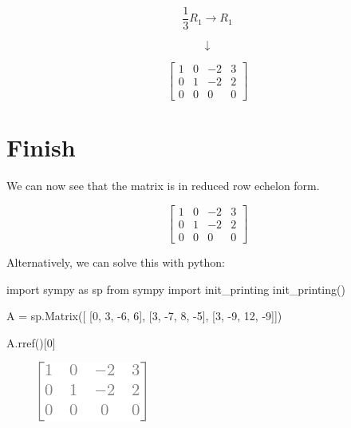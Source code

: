 \documentclass[
  letterpaper,
  DIV=11,
  numbers=noendperiod]{scrreprt}
\newenvironment{Shaded}{\begin{snugshade}}{\end{snugshade}}
\newcommand{\DecValTok}[1]{\textcolor[rgb]{0.68,0.00,0.00}{#1}}
\newcommand{\ImportTok}[1]{\textcolor[rgb]{0.00,0.46,0.62}{#1}}
\newcommand{\NormalTok}[1]{\textcolor[rgb]{0.00,0.23,0.31}{#1}}
\newcommand{\OperatorTok}[1]{\textcolor[rgb]{0.37,0.37,0.37}{#1}}
\begin{document}
\[
\frac{1}{3}R_1 \rightarrow R_1
\]

\[
\downarrow
\]

\[
\begin{bmatrix}
    1 & 0 & -2 & 3 \\
    0 & 1 & -2 & 2 \\
    0 & 0 & 0 & 0
\end{bmatrix}
\]

\chapter{Finish}

We can now see that the matrix is in reduced row echelon form.

\[
\begin{bmatrix}
    1 & 0 & -2 & 3 \\
    0 & 1 & -2 & 2 \\
    0 & 0 & 0 & 0
\end{bmatrix}
\]

Alternatively, we can solve this with python:

\begin{Shaded}
\begin{Highlighting}[]
\ImportTok{import}\NormalTok{ sympy }\ImportTok{as}\NormalTok{ sp  }
\ImportTok{from}\NormalTok{ sympy }\ImportTok{import}\NormalTok{ init\_printing}
\NormalTok{init\_printing()}

\NormalTok{A }\OperatorTok{=}\NormalTok{ sp.Matrix([}
\NormalTok{    [}\DecValTok{0}\NormalTok{,  }\DecValTok{3}\NormalTok{,  }\OperatorTok{{-}}\DecValTok{6}\NormalTok{,   }\DecValTok{6}\NormalTok{], }
\NormalTok{    [}\DecValTok{3}\NormalTok{, }\OperatorTok{{-}}\DecValTok{7}\NormalTok{,   }\DecValTok{8}\NormalTok{,  }\OperatorTok{{-}}\DecValTok{5}\NormalTok{], }
\NormalTok{    [}\DecValTok{3}\NormalTok{, }\OperatorTok{{-}}\DecValTok{9}\NormalTok{,  }\DecValTok{12}\NormalTok{,  }\OperatorTok{{-}}\DecValTok{9}\NormalTok{]])}

\NormalTok{A.rref()[}\DecValTok{0}\NormalTok{]}
\end{Highlighting}
\end{Shaded}

\begin{figure}[H]

{\centering \includegraphics{p2_files/figure-pdf/cell-3-output-1.png}

}

\end{figure}
\end{document}
